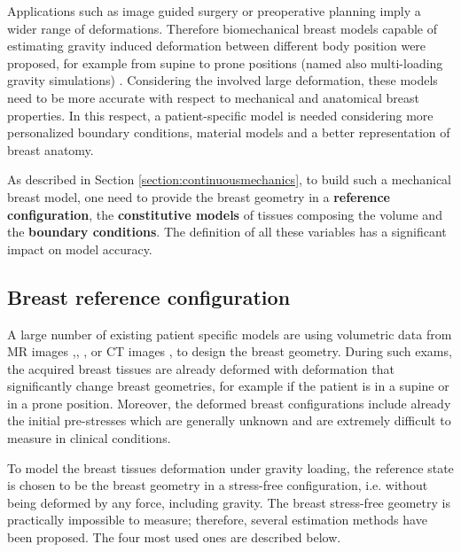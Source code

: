  Applications such as image guided surgery or preoperative planning imply a wider range of deformations. Therefore biomechanical breast models capable of estimating gravity induced deformation between different body position were proposed, for example from supine to prone positions (named also multi-loading gravity simulations) \citep{gamage_modelling_2012,georgii_simulation_2016,eiben_surface_2016} . Considering the involved large deformation, these models need to be more accurate with respect to mechanical and anatomical breast properties. In this respect, a patient-specific model is needed considering more personalized boundary conditions, material models and a better representation of breast anatomy. 

 
As described in Section \ref{section:continuousmechanics}, to build such a mechanical breast model, one need to provide the breast geometry in a \textbf{reference configuration}, the \textbf{constitutive models} of tissues composing the volume and the \textbf{boundary conditions}. The definition of all these variables has a significant impact on model accuracy.

\subsection{Breast reference configuration} 

A large number of existing patient specific models are using volumetric data from MR images \cite{carter_biomechanical_2009},\cite{kellner_simulation_2007}, \cite{conley_realization_2015} \cite{eiben_symmetric_2016}, \cite{martinez_finite_2017}  or CT images \cite{palomar_finite_2008},\cite{sturgeon_finite_element_2016} to design the breast geometry. During such exams, the acquired breast tissues are already deformed with deformation that significantly change breast geometries, for example if the patient is in a supine or in a prone position. Moreover, the deformed breast configurations include already the initial pre-stresses which are generally unknown and are extremely difficult to measure in clinical conditions. 
 

To model the breast tissues deformation under gravity loading, the reference state is chosen to be the breast geometry in a stress-free configuration, i.e. without being deformed by any force, including gravity. The breast stress-free geometry is practically impossible to measure; therefore, several estimation methods have been proposed. The four most used ones are described below.

